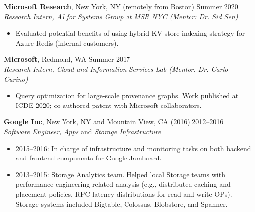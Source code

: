 \documentclass[centered,overlapped]{res}
\begin{document}
\begin{resume}
  \textbf{Microsoft Research}, New York, NY (remotely from Boston) \hfill Summer 2020 \\
  {\sl Research Intern, AI for Systems Group at MSR NYC (Mentor: Dr. Sid Sen)}
  \begin{itemize}
  \item Evaluated potential benefits of using hybrid KV-store indexing strategy for Azure Redis (internal customers).
  \end{itemize}

  \textbf{Microsoft}, Redmond, WA \hfill Summer 2017 \\
  {\sl Research Intern, Cloud and Information Services Lab (Mentor. Dr. Carlo Curino)}
  \begin{itemize}
  \item Query optimization for large-scale provenance graphs. Work published at ICDE 2020; co-authored patent with Microsoft collaborators.
  \end{itemize}

  \textbf{Google Inc}, New York, NY and Mountain View, CA (2016) \hfill 2012--2016 \\
  {\sl Software Engineer, Apps} and {\sl Storage Infrastructure}
  \begin{itemize}  \itemsep -2pt
  \item  2015--2016: In charge of infrastructure and monitoring tasks on both backend and frontend components for Google Jamboard.
  \item  2013--2015: Storage Analytics team. Helped local Storage teams with performance-engineering related analysis (e.g., distributed caching and placement policies, RPC latency distributions for read and write OPs). Storage systems included Bigtable, Colossus, Blobstore, and Spanner.
  \end{itemize}


\end{resume}
\end{document}
